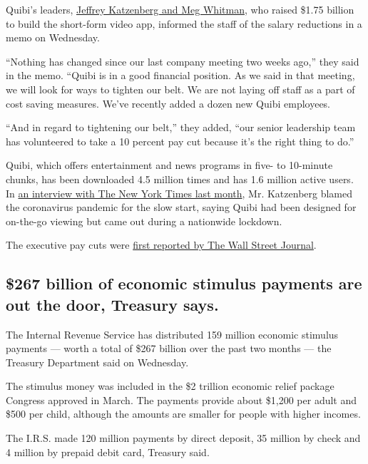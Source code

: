 Quibi's leaders,
\href{https://www.nytimes3xbfgragh.onion/2020/05/11/business/media/jeffrey-katzenberg-quibi-coronavirus.html}{Jeffrey
Katzenberg and Meg Whitman}, who raised \$1.75 billion to build the
short-form video app, informed the staff of the salary reductions in a
memo on Wednesday.

``Nothing has changed since our last company meeting two weeks ago,''
they said in the memo. ``Quibi is in a good financial position. As we
said in that meeting, we will look for ways to tighten our belt. We are
not laying off staff as a part of cost saving measures. We've recently
added a dozen new Quibi employees.

``And in regard to tightening our belt,'' they added, ``our senior
leadership team has volunteered to take a 10 percent pay cut because
it's the right thing to do.''

Quibi, which offers entertainment and news programs in five- to
10-minute chunks, has been downloaded 4.5 million times and has 1.6
million active users. In
\href{https://www.nytimes3xbfgragh.onion/2020/05/11/business/media/jeffrey-katzenberg-quibi-coronavirus.html}{an
interview with The New York Times last month}, Mr. Katzenberg blamed the
coronavirus pandemic for the slow start, saying Quibi had been designed
for on-the-go viewing but came out during a nationwide lockdown.

The executive pay cuts were
\href{https://www.wsj.com/articles/quibi-asks-senior-executives-to-take-10-pay-cut-11591206642}{first
reported by The Wall Street Journal}.

\hypertarget{267-billion-of-economic-stimulus-payments-are-out-the-door-treasury-says}{%
\subsection{\$267 billion of economic stimulus payments are out the
door, Treasury
says.}\label{267-billion-of-economic-stimulus-payments-are-out-the-door-treasury-says}}

The Internal Revenue Service has distributed 159 million economic
stimulus payments --- worth a total of \$267 billion over the past two
months --- the Treasury Department said on Wednesday.

The stimulus money was included in the \$2 trillion economic relief
package Congress approved in March. The payments provide about \$1,200
per adult and \$500 per child, although the amounts are smaller for
people with higher incomes.

The I.R.S. made 120 million payments by direct deposit, 35 million by
check and 4 million by prepaid debit card, Treasury said.

